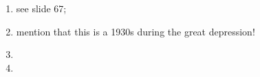 \documentclass[a4paper]{article}
\begin{document}








\begin{enumerate}
   \item see slide 67; 
   \item mention that this is a 1930s during the great depression!
   \item %
   \item %
\end{enumerate}
\end{document}
